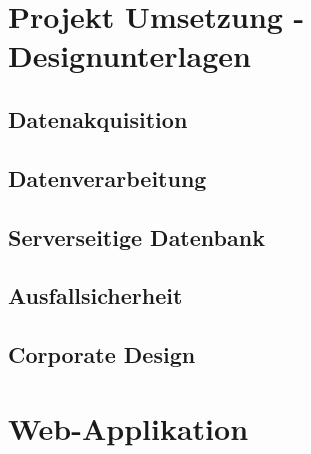 \documentclass[12pt]{article}
\newcommand\blankpage{%
    \null
    \thispagestyle{empty}%
    \addtocounter{page}{-1}%
    \newpage}
\begin{document}
%

\blankpage


\newpage %
\section{Projekt Umsetzung - Designunterlagen}


\subsection{Datenakquisition}


\subsection{Datenverarbeitung}


\newpage
\subsection{Serverseitige Datenbank}


\newpage %
\subsection{Ausfallsicherheit}


\newpage %
\subsection{Corporate Design}


\newpage %
\blankpage
\blankpage
\section{Web-Applikation}

\end{document}
